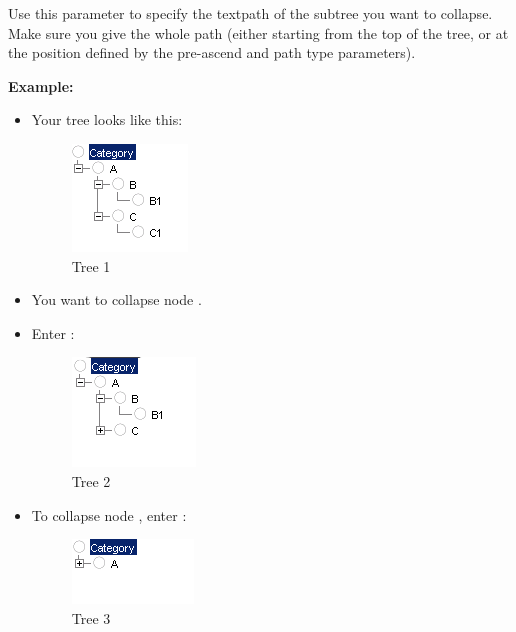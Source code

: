 Use this parameter to specify the textpath of the subtree you want to collapse.
Make sure you give the whole path (either starting from the top of the tree, or at the position defined by the pre-ascend and path type parameters).





\textbf{Example:}

\begin{itemize}
\item Your tree looks like this:

\begin{figure}
\begin{center}
\includegraphics{PS/Treeexample}
\caption{Tree 1}
\label{treeexample}
\end{center}
\end{figure}

\item You want to collapse node . 
\item Enter :

\begin{figure}
\begin{center}
\includegraphics{PS/Treeexample2}
\caption{Tree 2}
\label{treeexample2}
\end{center}
\end{figure}

\item To collapse node , enter :

\begin{figure}
\begin{center}
\includegraphics{PS/Treeexample3}
\caption{Tree 3}
\label{treeexample3}
\end{center}
\end{figure}

\end{itemize}

